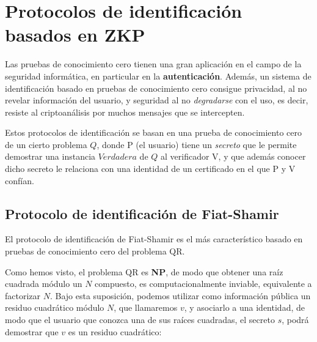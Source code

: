 \section{Protocolos de identificación basados en ZKP}


Las pruebas de conocimiento cero tienen una gran aplicación en el campo de la seguridad informática, en particular en la \textbf{autenticación}. Además, un sistema de identificación basado en pruebas de conocimiento cero consigue privacidad, al no revelar información del usuario, y seguridad al no \textit{degradarse} con el uso, es decir, resiste al criptoanálisis por muchos mensajes que se intercepten. 

Estos protocolos de identificación se basan en una prueba de conocimiento cero de un cierto problema $Q$, donde P (el usuario) tiene un \textit{secreto} que le permite demostrar una instancia $Verdadera$ de $Q$ al verificador V, y que además conocer dicho secreto le relaciona con una identidad de un certificado en el que P y V confían.


\subsection{Protocolo de identificación de Fiat-Shamir}

El protocolo de identificación de Fiat-Shamir es el más característico basado en pruebas de conocimiento cero del problema QR.

Como hemos visto, el problema QR es \textbf{NP}, de modo que obtener una raíz cuadrada módulo un $N$ compuesto, es computacionalmente inviable, equivalente a factorizar $N$. Bajo esta suposición, podemos utilizar como información pública un residuo cuadrático módulo $N$, que llamaremos $v$, y asociarlo a una identidad, de modo que el usuario que conozca una de sus raíces cuadradas, el secreto $s$, podrá demostrar que $v$ es un residuo cuadrático:


